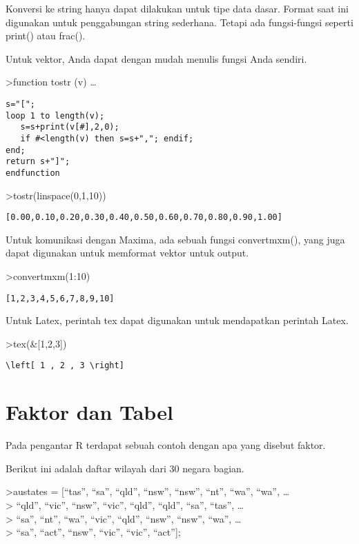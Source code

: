 \documentclass[
]{book}
\begin{document}
Konversi ke string hanya dapat dilakukan untuk tipe data dasar. Format saat ini digunakan untuk penggabungan string sederhana. Tetapi ada fungsi-fungsi seperti print() atau frac().

Untuk vektor, Anda dapat dengan mudah menulis fungsi Anda sendiri.

\textgreater function tostr (v) \ldots{}

\begin{verbatim}
s="[";
loop 1 to length(v);
   s=s+print(v[#],2,0);
   if #<length(v) then s=s+","; endif;
end;
return s+"]";
endfunction
\end{verbatim}

\textgreater tostr(linspace(0,1,10))

\begin{verbatim}
[0.00,0.10,0.20,0.30,0.40,0.50,0.60,0.70,0.80,0.90,1.00]
\end{verbatim}

Untuk komunikasi dengan Maxima, ada sebuah fungsi convertmxm(), yang juga dapat digunakan untuk memformat vektor untuk output.

\textgreater convertmxm(1:10)

\begin{verbatim}
[1,2,3,4,5,6,7,8,9,10]
\end{verbatim}

Untuk Latex, perintah tex dapat digunakan untuk mendapatkan perintah Latex.

\textgreater tex(\&{[}1,2,3{]})

\begin{verbatim}
\left[ 1 , 2 , 3 \right] 
\end{verbatim}

\section{Faktor dan Tabel}\label{faktor-dan-tabel}

Pada pengantar R terdapat sebuah contoh dengan apa yang disebut faktor.

Berikut ini adalah daftar wilayah dari 30 negara bagian.

\textgreater austates = {[}``tas'', ``sa'', ``qld'', ``nsw'', ``nsw'', ``nt'', ``wa'', ``wa'', \ldots{}\\
\textgreater{} ``qld'', ``vic'', ``nsw'', ``vic'', ``qld'', ``qld'', ``sa'', ``tas'', \ldots{}\\
\textgreater{} ``sa'', ``nt'', ``wa'', ``vic'', ``qld'', ``nsw'', ``nsw'', ``wa'', \ldots{}\\
\textgreater{} ``sa'', ``act'', ``nsw'', ``vic'', ``vic'', ``act''{]};
\end{document}

